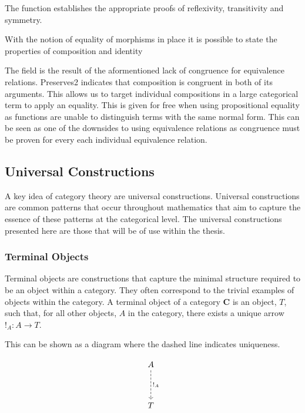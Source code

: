 
The  function establishes the appropriate proofs of
reflexivity, transitivity and symmetry.

With the notion of equality of morphisms in place it is possible to state the
properties of composition and identity


The field  is the result of the aformentioned lack of
congruence for equivalence relations. Preserves2 indicates that composition is
congruent in both of its arguments. This allows us to target individual
compositions in a large categorical term to apply an equality. This is given for
free when using propositional equality as functions are unable to distinguish
terms with the same normal form. This can be seen as one of the downsides to
using equivalence relations as congruence must be proven for every each
individual equivalence relation.

\subsection{Universal Constructions}

A key idea of category theory are universal constructions. Universal
constructions are common patterns that occur throughout mathematics
that aim to capture the essence of these patterns at the categorical level. The
universal constructions presented here are those that will be of use within the
thesis.

\subsubsection{Terminal Objects}
Terminal objects are constructions that capture the
minimal structure required to be an object within a category. They often
correspond to the trivial examples of objects within the category.
A terminal object of a category \textbf{C} is an object, $T$, such that, for all
other objects, $A$ in the category, there exists a unique arrow $!_{A}: A
\rightarrow T$.

This can be shown as a diagram where the dashed line indicates uniqueness.

\[\begin{tikzcd}[sep=huge]
A \arrow[d, "!_A", dashed] \\
T
\end{tikzcd}\]

